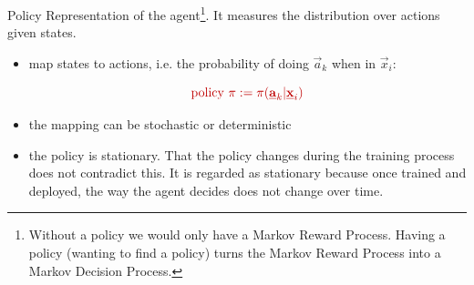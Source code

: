 \begin{frame}

\begin{block}{\textcolor{policy}{Policy}}
Representation of the agent\footnote{
Without a policy we would only have a Markov Reward Process.
Having a policy (wanting to find a policy) turns the Markov Reward Process into a Markov Decision Process.
}. It measures the distribution over actions given states.
\begin{itemize}
\item map states to actions, i.e. the probability of doing $\vec a_k$ when in $\vec x_i$:

\begin{equation}
\color{policy}
\text{policy }\pi := \pi(\vec a_k | \vec x_i)
\end{equation}

\pause

\item the mapping can be stochastic or deterministic
\item the policy is stationary. That the policy changes during the training process does not contradict this.
It is regarded as stationary because once trained and deployed, the way the agent decides does not change over time.
\end{itemize}

\end{block}

\end{frame}
